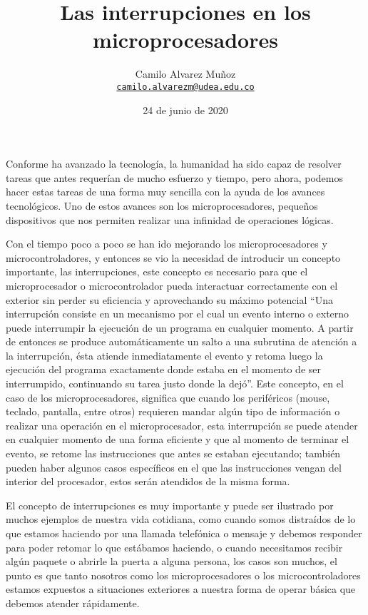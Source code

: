 \documentclass[11pt]{article}
\title{Las interrupciones en los microprocesadores}
\date{24 de junio de 2020}
\author{Camilo Alvarez Muñoz\\
\href{mailto:camilo.alvarezm@udea.edu.co}{\texttt{camilo.alvarezm@udea.edu.co}}}
\begin{document}
{
\maketitle}
Conforme ha avanzado la tecnología, la humanidad ha sido capaz de resolver tareas que antes requerían de mucho esfuerzo y tiempo, pero ahora, podemos hacer estas tareas de una forma muy sencilla con la ayuda de los avances tecnológicos. Uno de estos avances son los microprocesadores, pequeños dispositivos que nos permiten realizar una infinidad de operaciones lógicas.

Con el tiempo poco a poco se han ido mejorando los microprocesadores y microcontroladores, y entonces se vio la necesidad de introducir un concepto importante, las interrupciones, este concepto es necesario para que el microprocesador o microcontrolador pueda interactuar correctamente con el exterior sin perder su eficiencia y aprovechando su máximo potencial “Una interrupción consiste en un mecanismo por el cual un evento interno o externo puede interrumpir la ejecución de un programa en cualquier momento. A partir de entonces se produce automáticamente un salto a una subrutina de atención a la interrupción, ésta atiende inmediatamente el evento y retoma luego la ejecución del programa exactamente donde estaba en el momento de ser interrumpido, continuando su tarea justo donde la dejó”\cite{apaza2017microcontroladores}. Este concepto, en el caso de los microprocesadores, significa que cuando los periféricos (mouse, teclado, pantalla, entre otros) requieren mandar algún tipo de información o realizar una operación en el microprocesador, esta interrupción se puede atender en cualquier momento de una forma eficiente y que al momento de terminar el evento, se retome las instrucciones que antes se estaban ejecutando; también pueden haber algunos casos específicos en el que las instrucciones vengan del interior del procesador, estos serán atendidos de la misma forma.


El concepto de interrupciones es muy importante y puede ser ilustrado por muchos ejemplos de nuestra vida cotidiana, como cuando somos distraídos de lo que estamos haciendo por una llamada telefónica o mensaje y debemos responder para poder retomar lo que estábamos haciendo, o cuando necesitamos recibir algún paquete o abrirle la puerta a alguna persona, los casos son muchos, el punto es que tanto nosotros como los microprocesadores o los microcontroladores estamos expuestos a situaciones exteriores a nuestra forma de operar básica que debemos atender rápidamente.
\end{document}

